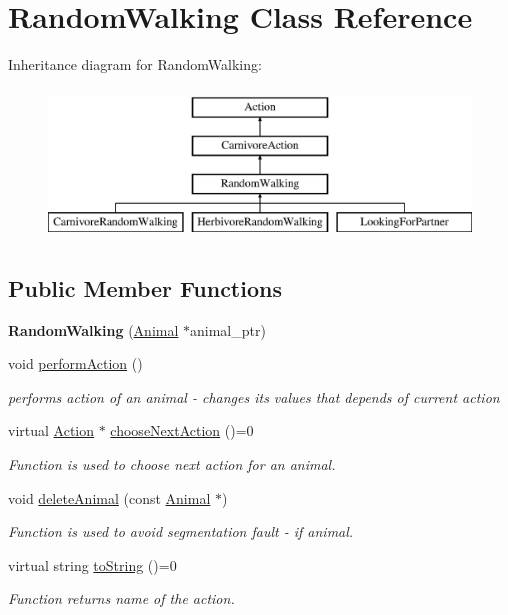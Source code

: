 \hypertarget{class_random_walking}{}\section{Random\+Walking Class Reference}
\label{class_random_walking}
Inheritance diagram for Random\+Walking\+:\begin{figure}[H]
\begin{center}
\leavevmode
\includegraphics[height=4.000000cm]{class_random_walking}
\end{center}
\end{figure}
\subsection*{Public Member Functions}
\begin{DoxyCompactItemize}
\item 
\hypertarget{class_random_walking_a2d78b8e5754d3d12db4811a2f922a963}{}{\bfseries Random\+Walking} (\hyperlink{class_animal}{Animal} $\ast$animal\+\_\+ptr)\label{class_random_walking_a2d78b8e5754d3d12db4811a2f922a963}

\item 
void \hyperlink{class_random_walking_a04a3fc96e180a6c0ab0af7d29e596082}{perform\+Action} ()
\begin{DoxyCompactList}\small\item\em performs action of an animal -\/ changes it\textquotesingle{}s values that depends of current action \end{DoxyCompactList}\item 
virtual \hyperlink{class_action}{Action} $\ast$ \hyperlink{class_random_walking_a7bfc651d40fd17944ed8efcdf58e0559}{choose\+Next\+Action} ()=0
\begin{DoxyCompactList}\small\item\em Function is used to choose next action for an animal. \end{DoxyCompactList}\item 
void \hyperlink{class_random_walking_af8be73eaa8ef5e21f0b127a32b34d4ad}{delete\+Animal} (const \hyperlink{class_animal}{Animal} $\ast$)
\begin{DoxyCompactList}\small\item\em Function is used to avoid segmentation fault -\/ if animal. \end{DoxyCompactList}\item 
virtual string \hyperlink{class_random_walking_a86f089cc5cc28d179e248c67477e8b30}{to\+String} ()=0
\begin{DoxyCompactList}\small\item\em Function returns name of the action. \end{DoxyCompactList}\end{DoxyCompactItemize}
